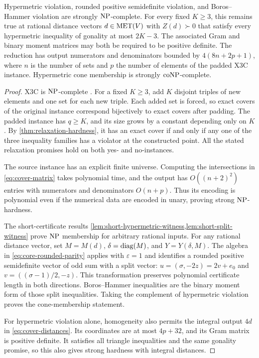 \begin{corollary}\label{cor:hypermetric-hardness}
Hypermetric violation, rounded positive semidefinite violation, and
Boros--Hammer violation are strongly $\mathrm{NP}$-complete.  For every fixed
$K\geq3$, this remains true
at rational distance vectors $d\in\operatorname{MET}(V)$ with $Z(d)\succ0$ that satisfy
every hypermetric inequality of gonality at most $2K-3$.
The associated Gram and binary moment matrices may both be
required to be positive definite.  The reduction has output numerators
and denominators bounded by $4(8n+2p+1)$, where $n$ is the number of sets
and $p$ the number of elements of the padded X3C instance.
Hypermetric cone membership is strongly $\mathrm{coNP}$-complete.
\end{corollary}

\begin{proof}
X3C is $\mathrm{NP}$-complete \citep{GareyJohnson1979}.  For a fixed $K\geq3$,
add $K$ disjoint triples of new elements and one set for each new triple.
Each added set is forced, so exact covers of the original instance
correspond bijectively to exact covers after padding.  The padded instance
has $q\geq K$, and its size grows by a constant depending only on $K$.
By \cref{thm:relaxation-hardness}, it has an exact cover if and only if
any one of the three inequality families has a violator at the constructed
point.  All the stated relaxation promises hold on both yes- and
no-instances.

The source instance has an explicit finite universe.  Computing the
intersections in \eqref{eq:cover-matrix} takes polynomial time, and the
output has $O((n+2)^2)$ entries with numerators and denominators
$O(n+p)$.  Thus its encoding is polynomial even if the numerical data
are encoded in unary, proving strong $\mathrm{NP}$-hardness.

The short-certificate results
\cref{lem:short-hypermetric-witness,lem:short-split-witness} prove
$\mathrm{NP}$ membership for arbitrary rational inputs.  For any rational distance
vector, set $M=M(d)$, $\delta=\operatorname{diag}(M)$, and $Y=Y(\delta,M)$.
The algebra in \eqref{eq:core-rounded-parity} applies with
$\varepsilon=1$ and identifies a rounded positive semidefinite vector
of odd sum with a split vector: $u=(\sigma,-2z)=2v+e_0$ and
$v=((\sigma-1)/2,-z)$.  This transformation preserves polynomial
certificate length in both directions.  Boros--Hammer inequalities are
the binary moment form of those split inequalities.  Taking the complement
of hypermetric violation proves the cone-membership statement.

For hypermetric violation alone, homogeneity also permits the integral
output $4d$ in \eqref{eq:cover-distances}.  Its coordinates are at most
$4p+32$, and its Gram matrix is positive definite.  It satisfies all
triangle inequalities and the same gonality promise, so this also gives
strong hardness with integral distances.
\end{proof}
